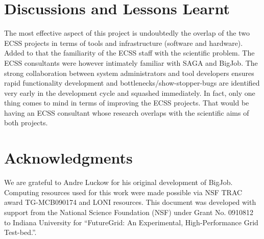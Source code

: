 \documentclass{sig-alternate}
\begin{document}
\section{Discussions and Lessons Learnt}


The most effective aspect of this project is undoubtedly the overlap of the two
ECSS projects in terms of tools and infrastructure (software and hardware).
Added to that the familiarity of the ECSS staff with the scientific problem.
The ECSS consultants were however intimately familiar with SAGA and BigJob. The
strong collaboration between system administrators and tool developers ensures
rapid functionality development and bottlenecks/show-stopper-bugs are identified
very early in the development cycle and squashed immediately. In fact, only one
thing comes to mind in terms of improving the ECSS projects. That would be
having an ECSS consultant whose research overlaps with the scientific aims of
both projects.



\section{Acknowledgments}
We are grateful to Andre Luckow for his original development of
BigJob.  Computing resources used for this work were made possible via
NSF TRAC award TG-MCB090174 and LONI resources.  This document was
developed with support from the National Science Foundation (NSF)
under Grant No.  0910812 to Indiana University for ``FutureGrid: An
Experimental, High-Performance Grid Test-bed.''.



\end{document}
